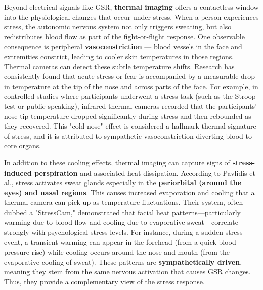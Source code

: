 Beyond electrical signals like GSR, \textbf{thermal imaging} offers a contactless window into the physiological changes that occur under stress. When a person experiences stress, the autonomic nervous system not only triggers sweating, but also redistributes blood flow as part of the fight-or-flight response. One observable consequence is peripheral \textbf{vasoconstriction} — blood vessels in the face and extremities constrict, leading to cooler skin temperatures in those regions. Thermal cameras can detect these subtle temperature shifts. Research has consistently found that acute stress or fear is accompanied by a measurable drop in temperature at the tip of the nose and across parts of the face\cite{ContactlessStressThermal2022}. For example, in controlled studies where participants underwent a stress task (such as the Stroop test or public speaking), infrared thermal cameras recorded that the participants' nose-tip temperature dropped significantly during stress and then rebounded as they recovered\cite{ContactlessStressThermal2022}. This "cold nose" effect is considered a hallmark thermal signature of stress, and it is attributed to sympathetic vasoconstriction diverting blood to core organs.

In addition to these cooling effects, thermal imaging can capture signs of \textbf{stress-induced perspiration} and associated heat dissipation. According to Pavlidis et al., stress activates sweat glands especially in the \textbf{periorbital (around the eyes) and nasal regions}. This causes increased evaporation and cooling that a thermal camera can pick up as temperature fluctuations\cite{DriverStressThermal2020}. Their system, often dubbed a "StressCam," demonstrated that facial heat patterns—particularly warming due to blood flow and cooling due to evaporative sweat—correlate strongly with psychological stress levels\cite{DriverStressThermal2020}. For instance, during a sudden stress event, a transient warming can appear in the forehead (from a quick blood pressure rise) while cooling occurs around the nose and mouth (from the evaporative cooling of sweat). These patterns are \textbf{sympathetically driven}, meaning they stem from the same nervous activation that causes GSR changes\cite{DriverStressThermal2020}. Thus, they provide a complementary view of the stress response.

